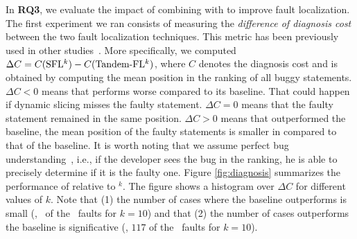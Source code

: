 \documentclass{article}
\begin{document}
In \textbf{RQ3}, we evaluate the impact of combining \ds{} with \sfl{}
to improve fault localization. The first experiment we ran consists of
measuring the \emph{difference of diagnosis cost} between the two
fault localization techniques. This metric has been previously used in
other
studies~\cite{7390282,ang-perez-van-deursen-rui-2017,Pearson:2017:EIF:3097368.3097441,Perez:2018:LQR:3304889.3304927}.
More specifically, we computed $\Delta{}C = C(\textrm{SFL$^{k}$}) -
C(\textrm{Tandem-FL$^{k}$})$, where $C$ denotes the diagnosis cost and is
obtained by computing the mean position in the ranking of all buggy
statements. $\Delta C <0$ means that  performs worse
compared to its baseline. That could happen if dynamic slicing misses
the faulty statement. $\Delta C=0$ means that the faulty statement
remained in the same position. $\Delta C >0$ means that 
outperformed the baseline, \ie{} the mean position of the faulty
statements is smaller in  compared to that of the
baseline. It is worth noting that we assume perfect bug
understanding~\cite{Parnin:2011:ADT:2001420.2001445}, i.e., if the
developer sees the bug in the ranking, he is able to precisely
determine if it is the faulty one.  Figure \ref{fig:diagnosis}
summarizes the performance of  relative to
\sfl{}$^{k}$. The figure shows a histogram over $\Delta{}C$ for
different values of $k$. Note that (1) the number of cases where the
baseline outperforms  is small (\eg{}, \numOutPerformed\ of
the \numFaults\ faults for $k=10$) and that (2) the number of cases
 outperforms the baseline is significative (\eg{}, $117$ of
the \numFaults\ faults for $k=10$).


\end{document}
